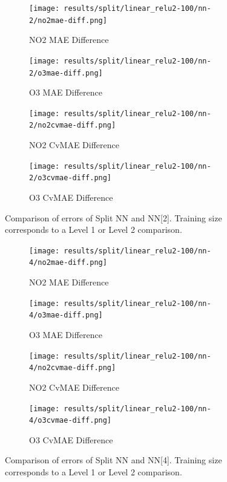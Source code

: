 \documentclass[journal abbreviation, manuscript]{copernicus}
\begin{document}
\begin{figure}[H]
\begin{subfigure}{0.49\textwidth}
\texttt{[image: results/split/linear\_relu2-100/nn-2/no2mae-diff.png]}
\caption{NO2 MAE Difference}
\end{subfigure}
\begin{subfigure}{0.49\textwidth}
\texttt{[image: results/split/linear\_relu2-100/nn-2/o3mae-diff.png]}
\caption{O3 MAE Difference}
\end{subfigure}
\begin{subfigure}{0.49\textwidth}
\texttt{[image: results/split/linear\_relu2-100/nn-2/no2cvmae-diff.png]}
\caption{NO2 CvMAE Difference}
\end{subfigure}
\begin{subfigure}{0.49\textwidth}
\texttt{[image: results/split/linear\_relu2-100/nn-2/o3cvmae-diff.png]}
\caption{O3 CvMAE Difference}
\end{subfigure}
\caption{Comparison of errors of Split NN and NN[2]. Training size corresponds to a Level 1 or Level 2 comparison.}
\end{figure}

\begin{figure}[H]
\begin{subfigure}{0.49\textwidth}
\texttt{[image: results/split/linear\_relu2-100/nn-4/no2mae-diff.png]}
\caption{NO2 MAE Difference}
\end{subfigure}
\begin{subfigure}{0.49\textwidth}
\texttt{[image: results/split/linear\_relu2-100/nn-4/o3mae-diff.png]}
\caption{O3 MAE Difference}
\end{subfigure}
\begin{subfigure}{0.49\textwidth}
\texttt{[image: results/split/linear\_relu2-100/nn-4/no2cvmae-diff.png]}
\caption{NO2 CvMAE Difference}
\end{subfigure}
\begin{subfigure}{0.49\textwidth}
\texttt{[image: results/split/linear\_relu2-100/nn-4/o3cvmae-diff.png]}
\caption{O3 CvMAE Difference}
\end{subfigure}
\caption{Comparison of errors of Split NN and NN[4]. Training size corresponds to a Level 1 or Level 2 comparison.}
\end{figure}
\end{document}
